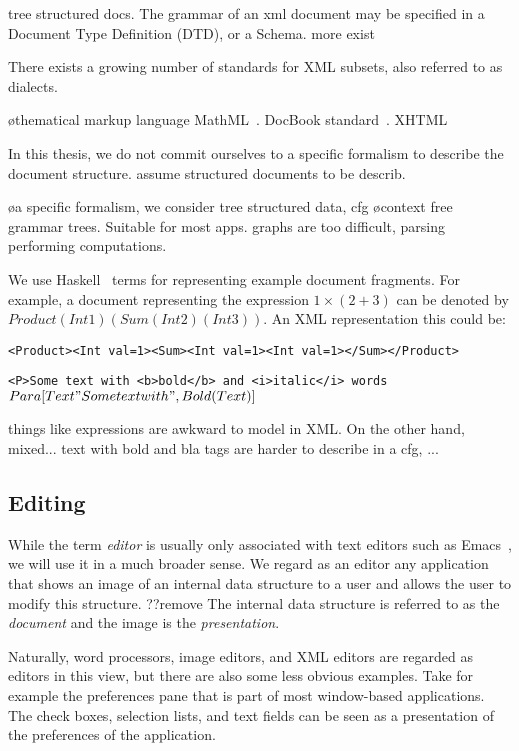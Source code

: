  tree structured docs. The grammar of an xml document may be specified in a Document Type Definition (DTD), or a Schema. 
more exist

There exists a growing number of standards for XML subsets, also referred to as dialects. 

\bl
\o thematical markup language MathML~\cite{mathml20}.  DocBook standard~\cite{walsh02docbook}. XHTML 
\el

In this thesis, we do not commit ourselves to a specific formalism to describe the document structure. assume structured documents to be describ. 

\bl
\o a specific formalism, we consider tree structured data, cfg
\o context free grammar trees. Suitable for most apps.  graphs are too difficult, parsing performing computations.
\el

We use Haskell~\cite{peytonJones03haskell} terms for representing example document fragments. For example, a document representing the expression $1 \times (2 + 3)$ can be denoted by $Product (Int 1) (Sum (Int 2) (Int 3))$. An XML representation this could be:

\verb|<Product><Int val=1><Sum><Int val=1><Int val=1></Sum></Product>|

\verb|<P>Some text with <b>bold</b> and <i>italic</i> words|
$Para [Text "Some text with", Bold (Text )]$


things like expressions are awkward to model in XML. On the other hand, mixed... text with bold and bla tags are harder to describe in a cfg, ...
\subsection{Editing}
\label{sect:editing}


While the term {\em editor} is usually only associated with text editors such as Emacs~\cite{stallman81emacs}, we will use it in a much broader sense. We regard as an editor any application that shows an image of an internal data structure to a user and allows the user to modify this structure. ??remove \rarr The internal data structure is referred to as the {\em document} and the image is the {\em presentation}. 

Naturally, word processors, image editors, and XML editors are regarded as editors in this view, but there are also some less obvious examples. Take for example the preferences pane that is part of most window-based applications. The check boxes, selection lists, and text fields can be seen as a presentation of the preferences of the application. 

